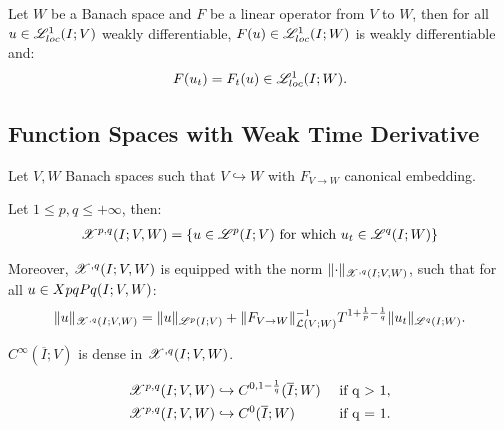 \begin{lemma}
    Let $W$ be a Banach space and $F$ be a linear operator from $V$ to $W$, then for all $u \in \mathscr{L}^{1}_{loc}(I; V)$ weakly differentiable, $F(u) \in \mathscr{L}^{1}_{loc}(I; W)$ is weakly differentiable and:
    \begin{gather}
        F(u_t) = F_t(u) \in \mathscr{L}^{1}_{loc}(I; W).
    \end{gather}
\end{lemma}

\newpage
\subsection{Function Spaces with Weak Time Derivative}

Let $V, W$ Banach spaces such that $V \hookrightarrow W$ with $F_{V \rightarrow W}$ canonical embedding.

\begin{definition}[$\Xpq{}{q}(I; V, W)$]
    Let $1 \leq p, q \leq +\infty$, then:
    \begin{gather}
        \mathscr{X}^{p, q}(I; V, W) = \left\{ u \in \mathscr{L}^{p}(I; V) \text{ for which } u_t \in \mathscr{L}^{q}(I; W) \right\}
    \end{gather}

    Moreover, $\Xpq{}{q}(I; V, W)$ is equipped with the norm $\lVert \cdot \rVert_{\mathscr{X}^{, q}(I; V, W)}$, such that for all $u \in \\Xpq{P}{q}(I; V, W)$:
    \begin{gather}
        \lVert u \rVert_{\mathscr{X}^{, q}(I; V, W)} = \lVert u \rVert_{\mathscr{L}^{p}(I; V)} + \lVert F_{V \rightarrow W} \rVert_{\mathcal{L}(V;W)}^{-1}T^{1 + \frac{1}{p} - \frac{1}{q}} \lVert u_t \rVert_{\mathscr{L}^{q}(I; W)}.
    \end{gather}
\end{definition}

\begin{theorem}
    $C^{\infty}(\overline{I}; V)$ is dense in $\Xpq{}{q}(I; V, W)$.
\end{theorem}

\begin{lemma} %
    \begin{align}
        & \mathscr{X}^{p, q}(I; V, W) \hookrightarrow C^{0, 1 - \frac{1}{q}}(\overline{I}; W) & \text{ if q > 1}, \\
        & \mathscr{X}^{p, q}(I; V, W) \hookrightarrow C^{0}(\overline{I}; W) & \text{ if q = 1}.
    \end{align}
\end{lemma}


